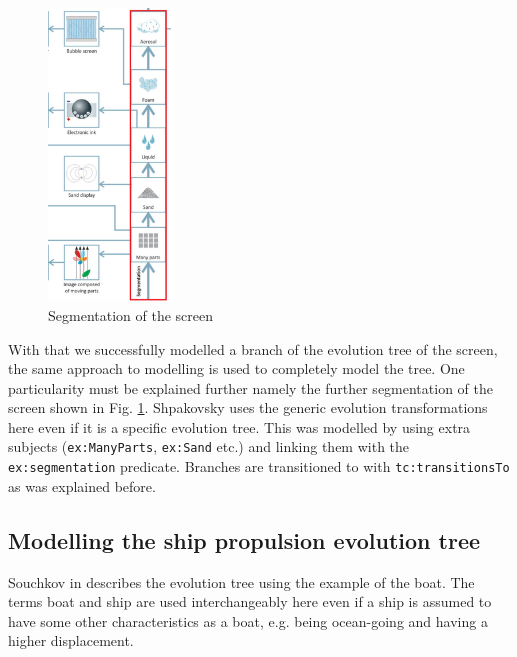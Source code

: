\documentclass[11pt,a4paper]{article}
\begin{document}
\begin{figure}
  \begin{center}\vspace*{-1em}
    \includegraphics[width=0.3\textwidth]{figures/segmentation.png}
  \end{center}
  \caption{\small Segmentation of the screen \cite{Shpakovsky2016}}
  \label{fig:segmentation}
\end{figure}

With that we successfully modelled a branch of the evolution tree of the
screen, the same approach to modelling is used to completely model the tree.
One particularity must be explained further namely the further segmentation of
the screen shown in Fig. \ref{fig:segmentation}. Shpakovsky uses the generic
evolution transformations here even if it is a specific evolution tree. This
was modelled by using extra subjects (\texttt{ex:ManyParts}, \texttt{ex:Sand}
etc.) and linking them with the \texttt{ex:segmentation} predicate. Branches
are transitioned to with \texttt{tc:transitionsTo} as was explained before.


\subsection{Modelling the ship propulsion evolution tree}

Souchkov in \cite{KS} describes the evolution tree using the example of the
boat. The terms boat and ship are used interchangeably here even if a ship is
assumed to have some other characteristics as a boat, e.g. being ocean-going
and having a higher displacement. 
\end{document}
